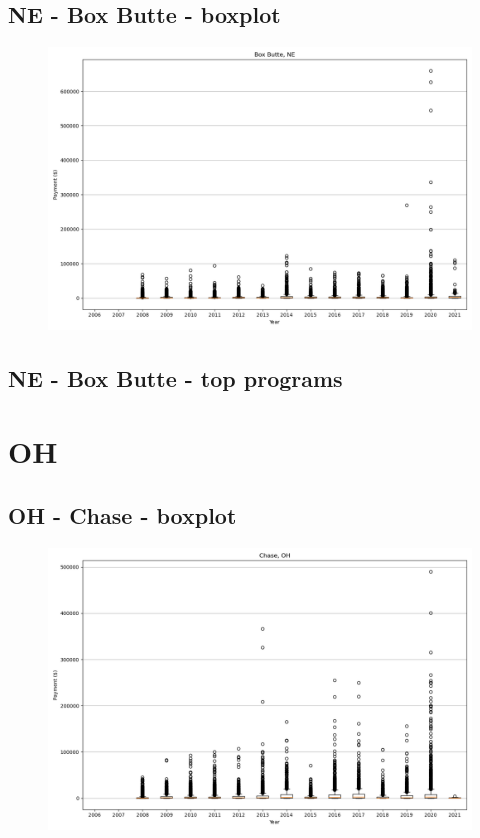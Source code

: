 \subsection*{NE - Box Butte - boxplot}
\begin{figure}[h]
\centering
\includegraphics[width=7in]{../output/boxplots/counties/Box Butte-NE_boxplot.png}
\end{figure}


\subsection*{NE - Box Butte - top programs}

\newpage
\section*{OH}
\subsection*{OH - Chase - boxplot}
\begin{figure}[h]
\centering
\includegraphics[width=7in]{../output/boxplots/counties/Chase-OH_boxplot.png}
\end{figure}



